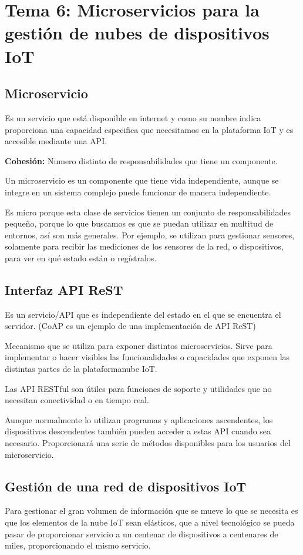 \documentclass[12pt]{report} %
\begin{document}
\chapter{Tema 6: Microservicios para la gestión de nubes de dispositivos IoT}
\section{Microservicio}
Es un servicio que está disponible en internet y como su nombre indica proporciona una capacidad especifica que necesitamos en la plataforma IoT y es accesible mediante una API.

\textbf{Cohesión:} Numero distinto de responsabilidades que tiene un componente.

Un microservicio es un componente que tiene vida independiente, aunque se integre en un sistema complejo puede funcionar de manera independiente.

Es micro porque esta clase de servicios tienen un conjunto de responsabilidades pequeño, porque lo que buscamos es que se puedan utilizar en multitud de entornos, así son más generales. Por ejemplo, se utilizan para gestionar sensores, solamente para recibir las mediciones de los sensores de la red, o dispositivos, para ver en qué estado están o regístralos.


\section{Interfaz API ReST}
Es un servicio/API que es independiente del estado en el que se encuentra el servidor. (CoAP es un ejemplo de una implementación de API ReST)

Mecanismo que se utiliza para exponer distintos microservicios. Sirve para implementar o hacer visibles las funcionalidades o capacidades que exponen las distintas partes de la plataforma\/nube IoT.

Las API RESTful son útiles para funciones de soporte y utilidades que no necesitan conectividad o en tiempo real.

Aunque normalmente lo utilizan programas y aplicaciones ascendentes, los dispositivos descendentes también pueden acceder a estas API cuando sea necesario. Proporcionará una serie de métodos disponibles para los usuarios del microservicio.


\section{Gestión de una red de dispositivos IoT}
Para gestionar el gran volumen de información que se mueve lo que se necesita es que los elementos de la nube IoT sean elásticos, que a nivel tecnológico se pueda pasar de proporcionar servicio a un centenar de dispositivos a centenares de miles, proporcionando el mismo servicio.
\end{document}
